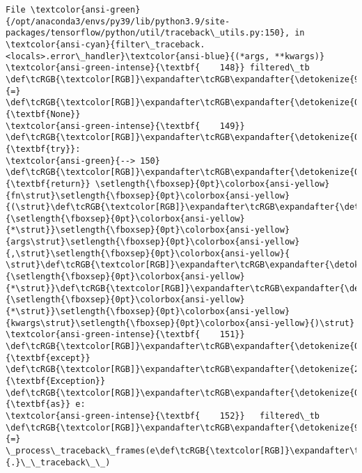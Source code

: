 \documentclass[11pt]{article}
\begin{document}
\begin{Verbatim}[commandchars=\\\{\}, frame=single, framerule=2mm, rulecolor=\color{outerrorbackground}]
File \textcolor{ansi-green}{/opt/anaconda3/envs/py39/lib/python3.9/site-packages/tensorflow/python/util/traceback\_utils.py:150}, in \textcolor{ansi-cyan}{filter\_traceback.<locals>.error\_handler}\textcolor{ansi-blue}{(*args, **kwargs)}
\textcolor{ansi-green-intense}{\textbf{    148}} filtered\_tb \def\tcRGB{\textcolor[RGB]}\expandafter\tcRGB\expandafter{\detokenize{98,98,98}}{=} \def\tcRGB{\textcolor[RGB]}\expandafter\tcRGB\expandafter{\detokenize{0,135,0}}{\textbf{None}}
\textcolor{ansi-green-intense}{\textbf{    149}} \def\tcRGB{\textcolor[RGB]}\expandafter\tcRGB\expandafter{\detokenize{0,135,0}}{\textbf{try}}:
\textcolor{ansi-green}{--> 150}   \def\tcRGB{\textcolor[RGB]}\expandafter\tcRGB\expandafter{\detokenize{0,135,0}}{\textbf{return}} \setlength{\fboxsep}{0pt}\colorbox{ansi-yellow}{fn\strut}\setlength{\fboxsep}{0pt}\colorbox{ansi-yellow}{(\strut}\def\tcRGB{\textcolor[RGB]}\expandafter\tcRGB\expandafter{\detokenize{98,98,98}}{\setlength{\fboxsep}{0pt}\colorbox{ansi-yellow}{*\strut}}\setlength{\fboxsep}{0pt}\colorbox{ansi-yellow}{args\strut}\setlength{\fboxsep}{0pt}\colorbox{ansi-yellow}{,\strut}\setlength{\fboxsep}{0pt}\colorbox{ansi-yellow}{ \strut}\def\tcRGB{\textcolor[RGB]}\expandafter\tcRGB\expandafter{\detokenize{98,98,98}}{\setlength{\fboxsep}{0pt}\colorbox{ansi-yellow}{*\strut}}\def\tcRGB{\textcolor[RGB]}\expandafter\tcRGB\expandafter{\detokenize{98,98,98}}{\setlength{\fboxsep}{0pt}\colorbox{ansi-yellow}{*\strut}}\setlength{\fboxsep}{0pt}\colorbox{ansi-yellow}{kwargs\strut}\setlength{\fboxsep}{0pt}\colorbox{ansi-yellow}{)\strut}
\textcolor{ansi-green-intense}{\textbf{    151}} \def\tcRGB{\textcolor[RGB]}\expandafter\tcRGB\expandafter{\detokenize{0,135,0}}{\textbf{except}} \def\tcRGB{\textcolor[RGB]}\expandafter\tcRGB\expandafter{\detokenize{215,95,95}}{\textbf{Exception}} \def\tcRGB{\textcolor[RGB]}\expandafter\tcRGB\expandafter{\detokenize{0,135,0}}{\textbf{as}} e:
\textcolor{ansi-green-intense}{\textbf{    152}}   filtered\_tb \def\tcRGB{\textcolor[RGB]}\expandafter\tcRGB\expandafter{\detokenize{98,98,98}}{=} \_process\_traceback\_frames(e\def\tcRGB{\textcolor[RGB]}\expandafter\tcRGB\expandafter{\detokenize{98,98,98}}{.}\_\_traceback\_\_)


\end{Verbatim}
\end{document}
